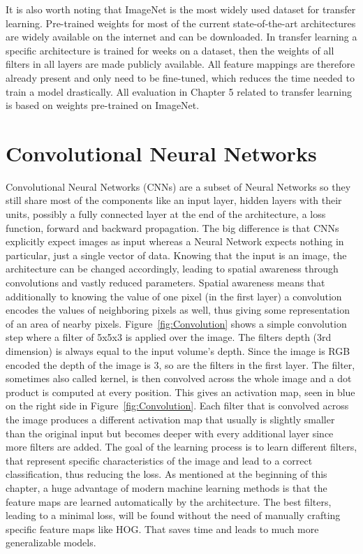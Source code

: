It is also worth noting that ImageNet is the most widely used dataset for transfer learning. Pre-trained weights for most of the current state-of-the-art architectures are widely available on the internet and can be downloaded. In transfer learning a specific architecture is trained for weeks on a dataset, then the weights of all filters in all layers are made publicly available. All feature mappings are therefore already present and only need to be fine-tuned, which reduces the time needed to train a model drastically. All evaluation in Chapter 5 related to transfer learning is based on weights pre-trained on ImageNet.\\


\section{Convolutional Neural Networks}

Convolutional Neural Networks (CNNs) are a subset of Neural Networks so they still share most of the components like an input layer, hidden layers with their units, possibly a fully connected layer at the end of the architecture, a loss function, forward and backward propagation. The big difference is that CNNs explicitly expect images as input whereas a Neural Network expects nothing in particular, just a single vector of data. Knowing that the input is an image, the architecture can be changed accordingly, leading to spatial awareness through convolutions and vastly reduced parameters. Spatial awareness means that additionally to knowing the value of one pixel (in the first layer) a convolution encodes the values of neighboring pixels as well, thus giving some representation of an area of nearby pixels. Figure~\ref{fig:Convolution} shows a simple convolution step where a filter of 5x5x3 is applied over the image. The filters depth (3rd dimension) is always equal to the input volume's depth. Since the image is RGB encoded the depth of the image is 3, so are the filters in the first layer. The filter, sometimes also called kernel, is then convolved across the whole image and a dot product is computed at every position. This gives an activation map, seen in blue on the right side in Figure~\ref{fig:Convolution}. Each filter that is convolved across the image produces a different activation map that usually is slightly smaller than the original input but becomes deeper with every additional layer since more filters are added. The goal of the learning process is to learn different filters, that represent specific characteristics of the image and lead to a correct classification, thus reducing the loss. As mentioned at the beginning of this chapter, a huge advantage of modern machine learning methods is that the feature maps are learned automatically by the architecture. The best filters, leading to a minimal loss, will be found without the need of manually crafting specific feature maps like HOG. That saves time and leads to much more generalizable models.\\



